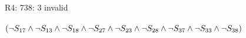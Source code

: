 \documentclass[a4paper, 14pt]{amsart}
\begin{document}
R4: 738: 3 invalid
\\
\\
$
\\
(\neg S_{17} \wedge \neg S_{13} \wedge \neg S_{18} \wedge \neg S_{27} \wedge \neg S_{23} \wedge \neg S_{28} \wedge \neg S_{37} \wedge \neg S_{33} \wedge \neg S_{38})
\\
$
\end{document}
